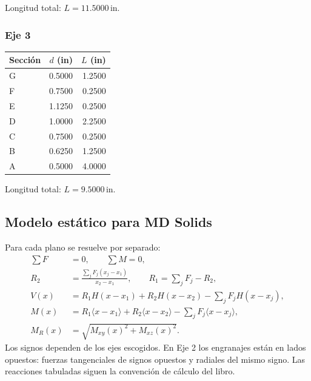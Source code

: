 \documentclass[11pt,a4paper]{article}
\newcommand{\inch}{\,\mathrm{in}}
\begin{document}
Longitud total: $L=11.5000\inch$.

\subsubsection*{Eje 3}

\begin{center}\small\begin{tabular}{lrr}\toprule

Sección & $d$ (in) & $L$ (in) \\ \midrule

G & 0.5000 & 1.2500 \\

F & 0.7500 & 0.2500 \\

E & 1.1250 & 0.2500 \\

D & 1.0000 & 2.2500 \\

C & 0.7500 & 0.2500 \\

B & 0.6250 & 1.2500 \\

A & 0.5000 & 4.0000 \\

\bottomrule\end{tabular}\end{center}

Longitud total: $L=9.5000\inch$.

\subsection{Modelo estático para MD Solids}
Para cada plano se resuelve por separado:
\begin{align*}
\sum F&=0,\qquad\sum M=0,\\
R_2&=\frac{\sum_jF_j(x_j-x_1)}{x_2-x_1},\qquad R_1=\sum_jF_j-R_2,\\
V(x)&=R_1H(x-x_1)+R_2H(x-x_2)-\sum_jF_jH(x-x_j),\\
M(x)&=R_1\langle x-x_1\rangle+R_2\langle x-x_2\rangle-\sum_jF_j\langle x-x_j\rangle,\\
M_R(x)&=\sqrt{M_{xy}(x)^2+M_{xz}(x)^2}.
\end{align*}
Los signos dependen de los ejes escogidos. En Eje 2 los engranajes están en lados opuestos: fuerzas tangenciales de signos opuestos y radiales del mismo signo. Las reacciones tabuladas siguen la convención de cálculo del libro.
\end{document}
